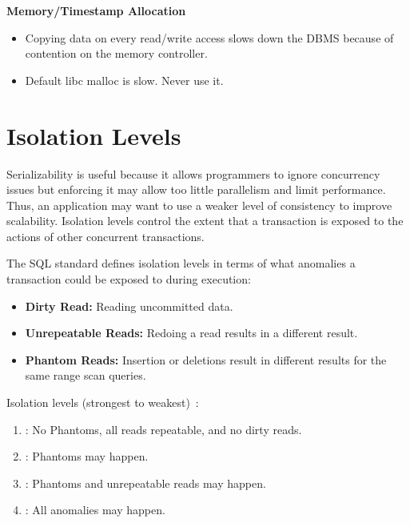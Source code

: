 \documentclass[11pt]{article}
\begin{document}
\textbf{Memory/Timestamp Allocation}
\begin{itemize}
    \item
    Copying data on every read/write access slows down the DBMS because of contention on the memory 
    controller.
    
    \item
    Default libc malloc is slow. Never use it.
\end{itemize}

\section{Isolation Levels}
Serializability is useful because it allows programmers to ignore concurrency issues but 
enforcing it may allow too little parallelism and limit performance. Thus, an application may 
want to use a weaker level of consistency to improve scalability. Isolation levels control the 
extent that a transaction is exposed to the actions of other concurrent transactions.

The SQL standard defines isolation levels in terms of what anomalies a transaction could be 
exposed to during execution:
\begin{itemize}
    \item \textbf{Dirty Read:}
    Reading uncommitted data.
    
    \item \textbf{Unrepeatable Reads:}
    Redoing a read results in a different result.
    
    \item \textbf{Phantom Reads:}
    Insertion or deletions result in different results for 
    the same range scan queries.
\end{itemize}
    
Isolation levels (strongest to weakest)~\cite{adya00}:
\begin{enumerate}
    \item {}:
    No Phantoms, all reads repeatable, and no dirty reads.
    
    \item {}:
    Phantoms may happen.
    
    \item {}:
    Phantoms and unrepeatable reads may happen.
    
    \item {}:
    All anomalies may happen.
\end{enumerate}
    
\end{document}
